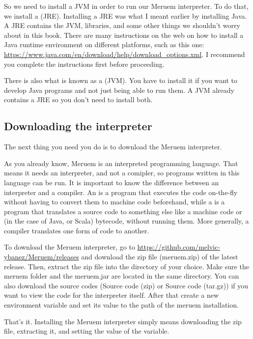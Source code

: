 So we need to install a JVM in order to run our Meruem interpreter. To do that, we install a  (JRE). Installing a JRE was what I meant earlier by installing Java. A JRE contains the JVM, libraries, and some other things we shouldn't worry about in this book. There are many instructions on the web on how to install a Java runtime environment on different platforms, such as this one: \url{ https://www.java.com/en/download/help/download_options.xml}. I recommend you complete the instructions first before proceeding.

\begin{noteparagraph}
There is also what is known as a  (JVM). You have to install it if you want to develop Java programs and not just being able to run them. A JVM already contains a JRE so you don't need to install both.
\end{noteparagraph}

\subsection{Downloading the interpreter}
The next thing you need you do is to download the Meruem interpreter. 

As you already know, Meruem is an interpreted programming language. That means it needs an interpreter, and not a comipler, so programs written in this language can be run. It is important to know the difference between an interpreter and a compiler. An  is a program that executes the code on-the-fly without having to convert them to machine code beforehand, while a  is a program that translates a source code to something else like a machine code or (in the case of Java, or Scala) bytecode, without running them. More generally, a compiler translates one form of code to another.

To download the Meruem interpreter, go to \url{https://github.com/melvic-ybanez/Meruem/releases} and download the zip file (meruem.zip) of the latest release. Then, extract the zip file into the directory of your choice. Make sure the meruem folder and the meruem.jar are located in the same directory. You can also download the source codes (Source code (zip) or Source code (tar.gz)) if you want to view the code for the interpreter itself. After that create a new environment variable  and set its value to the path of the meruem installation.

That's it. Installing the Meruem interpreter simply means downloading the zip file, extracting it, and setting the value of the  variable.

